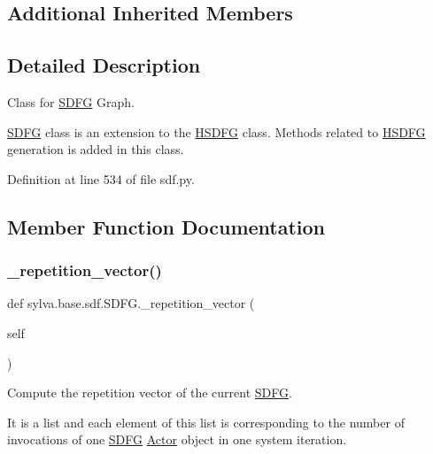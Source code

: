 \subsection*{Additional Inherited Members}


\subsection{Detailed Description}
Class for \hyperlink{classsylva_1_1base_1_1sdf_1_1_s_d_f_g}{S\+D\+FG} Graph. 

\hyperlink{classsylva_1_1base_1_1sdf_1_1_s_d_f_g}{S\+D\+FG} class is an extension to the \hyperlink{classsylva_1_1base_1_1sdf_1_1_h_s_d_f_g}{H\+S\+D\+FG} class. Methods related to \hyperlink{classsylva_1_1base_1_1sdf_1_1_h_s_d_f_g}{H\+S\+D\+FG} generation is added in this class. 

Definition at line 534 of file sdf.\+py.



\subsection{Member Function Documentation}
\mbox{\label{classsylva_1_1base_1_1sdf_1_1_s_d_f_g_a27f061deddd418fd4945acbd9c01122a}} 
\subsubsection{\texorpdfstring{\+\_\+repetition\+\_\+vector()}{\_repetition\_vector()}}
{\footnotesize\ttfamily def sylva.\+base.\+sdf.\+S\+D\+F\+G.\+\_\+repetition\+\_\+vector (\begin{DoxyParamCaption}\item[{}]{self }\end{DoxyParamCaption})\hspace{0.3cm}{\ttfamily [private]}}



Compute the repetition vector of the current \hyperlink{classsylva_1_1base_1_1sdf_1_1_s_d_f_g}{S\+D\+FG}. 

It is a list and each element of this list is corresponding to the number of invocations of one \hyperlink{classsylva_1_1base_1_1sdf_1_1_s_d_f_g}{S\+D\+FG} \hyperlink{classsylva_1_1base_1_1sdf_1_1_actor}{Actor} object in one system iteration.

